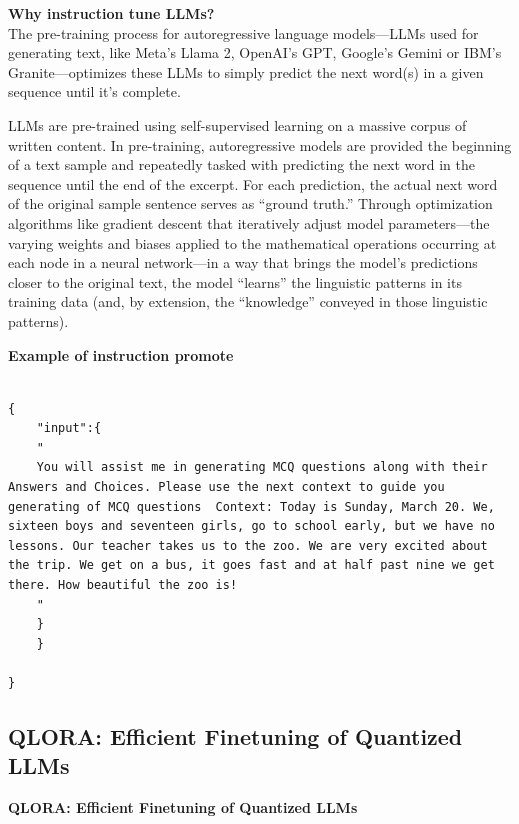 \hfill \break
\textbf{Why instruction tune LLMs?} \\

The pre-training process for autoregressive language models—LLMs used for generating text, like Meta’s Llama 2, OpenAI’s GPT, Google’s Gemini or IBM’s Granite—optimizes these LLMs to simply predict the next word(s) in a given sequence until it’s complete.

\hfill 

LLMs are pre-trained using self-supervised learning on a massive corpus of written content. In pre-training, autoregressive models are provided the beginning of a text sample and repeatedly tasked with predicting the next word in the sequence until the end of the excerpt. For each prediction, the actual next word of the original sample sentence serves as “ground truth.” Through optimization algorithms like gradient descent that iteratively adjust model parameters—the varying weights and biases applied to the mathematical operations occurring at each node in a neural network—in a way that brings the model’s predictions closer to the original text, the model “learns” the linguistic patterns in its training data (and, by extension, the “knowledge” conveyed in those linguistic patterns).

\hfill \break
\textbf{Example of instruction promote} \\


\begin{center}
\begin{lstlisting}

{
    "input":{
    "
    You will assist me in generating MCQ questions along with their Answers and Choices. Please use the next context to guide you generating of MCQ questions  Context: Today is Sunday, March 20. We, sixteen boys and seventeen girls, go to school early, but we have no lessons. Our teacher takes us to the zoo. We are very excited about the trip. We get on a bus, it goes fast and at half past nine we get there. How beautiful the zoo is!
    "
    }
    }

}
\end{lstlisting}
\end{center}


\subsection{QLORA: Efficient Finetuning of Quantized LLMs} 

\hfill \break
\textbf{QLORA: Efficient Finetuning of Quantized LLMs}


